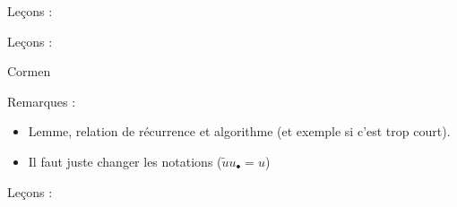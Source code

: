 \documentclass[../agregation.tex]{subfiles}
\begin{document}

%

Leçons :
\begin{itemize}
\end{itemize}

Leçons :
\begin{itemize}
\end{itemize}

Cormen

Remarques :
\begin{itemize}
	\item Lemme, relation de récurrence et algorithme (et exemple si c'est trop court).
	\item Il faut juste changer les notations ($\widetilde{u}u_\bullet=u$)
\end{itemize}




Leçons :
\begin{itemize}
\end{itemize}
\end{document}
